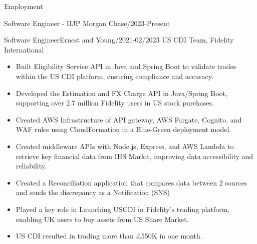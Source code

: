 \documentclass[]{mcdowellcv}
\begin{document}
\begin{cvsection}{Employment}
\begin{cvsubsection}{Software Engineer - II}{JP Morgan Chase}{/2023-Present}
\begin{itemize}
            \end{itemize}
        \end{cvsubsection}
        \begin{cvsubsection}{Software Engineer}{Ernest and Young}{/2021-02/2023}
            US CDI Team,    Fidelity International
            \begin{itemize}
                \item Built Eligibility Service API in Java and Spring Boot to validate trades within the US CDI platform, ensuring compliance and accuracy.
                \item Developed the Estimation and FX Charge API in Java/Spring Boot, supporting over 2.7 million Fidelity users in US stock purchases.
                \item Created AWS Infrastructure of API gateway, AWS Fargate, Cognito, and WAF rules using CloudFormation in a Blue-Green deployment model.
                \item Created middleware APIs with Node.js, Express, and AWS Lambda to retrieve key financial data from IHS Markit, improving data accessibility and reliability.
                \item Created a Reconciliation application that compares data between 2 sources and sends the discrepancy as a
                Notification (SNS)
                \item Played a key role in Launching USCDI in Fidelity's trading platform, enabling UK users to buy assets from US Share Market.
                \item US CDI resulted in trading more than £550K in one month.
            \end{itemize}
        \end{cvsubsection}
%

\end{cvsection}
\end{document}
